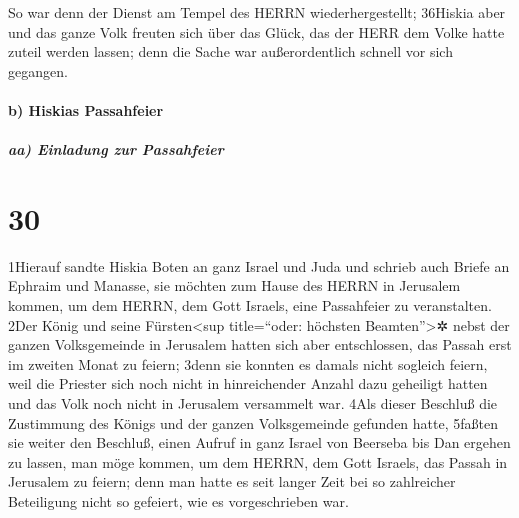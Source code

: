 So war denn der Dienst am Tempel des HERRN wiederhergestellt; 36Hiskia
aber und das ganze Volk freuten sich über das Glück, das der HERR dem
Volke hatte zuteil werden lassen; denn die Sache war außerordentlich
schnell vor sich gegangen.

\hypertarget{b-hiskias-passahfeier}{%
\paragraph{b) Hiskias Passahfeier}\label{b-hiskias-passahfeier}}

\hypertarget{aa-einladung-zur-passahfeier}{%
\subparagraph{aa) Einladung zur
Passahfeier}\label{aa-einladung-zur-passahfeier}}

\hypertarget{section-29}{%
\section{30}\label{section-29}}

1Hierauf sandte Hiskia Boten an ganz Israel und Juda und schrieb auch
Briefe an Ephraim und Manasse, sie möchten zum Hause des HERRN in
Jerusalem kommen, um dem HERRN, dem Gott Israels, eine Passahfeier zu
veranstalten. 2Der König und seine Fürsten\textless sup title=``oder:
höchsten Beamten''\textgreater✲ nebst der ganzen Volksgemeinde in
Jerusalem hatten sich aber entschlossen, das Passah erst im zweiten
Monat zu feiern; 3denn sie konnten es damals nicht sogleich feiern, weil
die Priester sich noch nicht in hinreichender Anzahl dazu geheiligt
hatten und das Volk noch nicht in Jerusalem versammelt war. 4Als dieser
Beschluß die Zustimmung des Königs und der ganzen Volksgemeinde gefunden
hatte, 5faßten sie weiter den Beschluß, einen Aufruf in ganz Israel von
Beerseba bis Dan ergehen zu lassen, man möge kommen, um dem HERRN, dem
Gott Israels, das Passah in Jerusalem zu feiern; denn man hatte es seit
langer Zeit bei so zahlreicher Beteiligung nicht so gefeiert, wie es
vorgeschrieben war.

